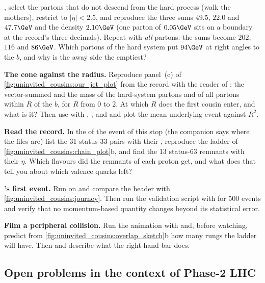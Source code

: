 \begin{exercises}
  , select the partons that do not descend from the
  hard process (walk the mothers), restrict to $|\eta|<2.5$, and reproduce
  the three sums $49.5$, $22.0$ and $47.7\GeV$ and the density $2.10\GeV$
  (one parton of $0.05\GeV$ sits on a boundary at the record's three
  decimals). Repeat with \emph{all} partons: the sums become $202$, $116$
  and $86\GeV$. Which partons of the hard system put $94\GeV$ at right
  angles to the $b$, and why is the away side the emptiest?
\item \textbf{The cone against the radius.} Reproduce panel~(c) of
  \cref{fig:uninvited_cousins:our_jet_plot} from the record with the reader
  of : the vector-summed \pt and the mass of the
  hard-system partons and of all partons within $R$ of the $b$, for $R$
  from $0$ to $2$. At which $R$ does the first cousin enter, and what is it?
  Then use  with , ,
   and  and plot the mean underlying-event \pt against
  $R^2$.
\item \textbf{Read the \CMSSW record.} In the  of the
  \CMSSW event of this stop (the companion says where the files are) list
  the 31 status-33 pairs with their \pt, reproduce the ladder of
  \cref{fig:uninvited_cousins:chain_plot}b, and find the 13 status-63
  remnants with their $\eta$. Which flavours did the remnants of each proton
  get, and what does that tell you about which valence quarks left?
\item \textbf{\PYTHIA's first event.} Run  on
   and compare the header with
  \cref{fig:uninvited_cousins:journey}. Then run the validation script
  with  for 500 events and verify that no momentum-based
  quantity changes beyond its statistical error.
\item \textbf{Film a peripheral collision.} Run the animation with
   and, before watching, predict from
  \cref{fig:uninvited_cousins:overlap_sketch}b how many rungs the ladder
  will have. Then  and describe what the
  right-hand bar does.
\end{exercises}

\subsection*{Open problems in the context of Phase-2 LHC}
\label{sec:uninvited_cousins:open_problems}

